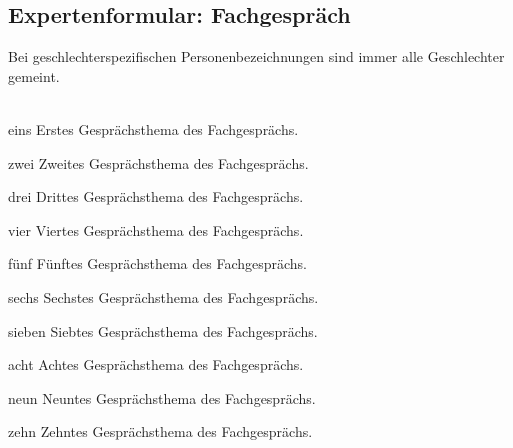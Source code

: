 \documentclass{scrreprt}
\newcommand{\varTitle}{Expertenformular: Fachgespräch}
\begin{document}
\begin{Form}
  \chapter{\varTitle}
  Bei geschlechterspezifischen Personenbezeichnungen sind immer alle Geschlechter gemeint.\\
  \\
  \sbox{}
  \sbox{}
  \sbox{}
  \sbox{}
  
  \begin{questionitem}{eins}
    Erstes Gesprächsthema des Fachgesprächs.
  \end{questionitem}
  \begin{questionitem}{zwei}
    Zweites Gesprächsthema des Fachgesprächs.
  \end{questionitem}
  \begin{questionitem}{drei}
    Drittes Gesprächsthema des Fachgesprächs.
  \end{questionitem}
  \begin{questionitem}{vier}
    Viertes Gesprächsthema des Fachgesprächs.
  \end{questionitem}
  \begin{questionitem}{fünf}
    Fünftes Gesprächsthema des Fachgesprächs.
  \end{questionitem}
  \begin{questionitem}{sechs}
    Sechstes Gesprächsthema des Fachgesprächs.
  \end{questionitem}
  \begin{questionitem}{sieben}
    Siebtes Gesprächsthema des Fachgesprächs.
  \end{questionitem}
  \begin{questionitem}{acht}
    Achtes Gesprächsthema des Fachgesprächs.
  \end{questionitem}
  \begin{questionitem}{neun}
    Neuntes Gesprächsthema des Fachgesprächs.
  \end{questionitem}
  \begin{questionitem}{zehn}
    Zehntes Gesprächsthema des Fachgesprächs.
  \end{questionitem}
\end{Form}
\end{document}
